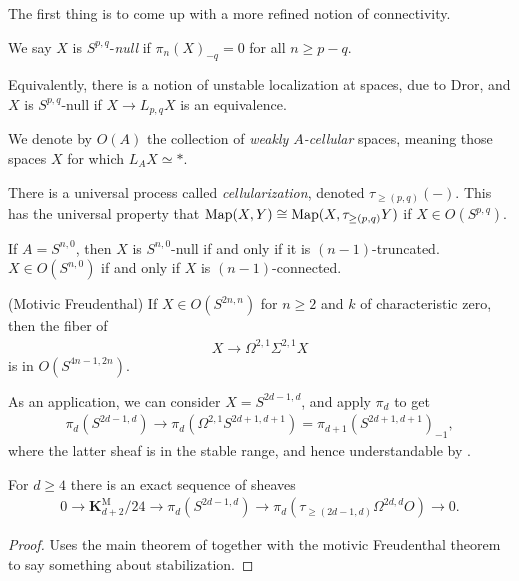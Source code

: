 \documentclass[11pt,openany]{book}
\providecommand{\KM}{\mathbf{K}^\mathrm{M}}
\begin{document}
The first thing is to come up with a more refined notion of connectivity.

\begin{definition} We say $X$ is $S^{p,q}$-\textit{null} if $\pi_n(X)_{-q} = 0$ for all $n \ge p-q$.
\end{definition}

Equivalently, there is a notion of unstable localization at spaces, due to Dror, and $X$ is $S^{p,q}$-null if $X \to L_{p,q}X$ is an equivalence.

\begin{definition} We denote by $O(A)$ the collection of \textit{weakly $A$-cellular} spaces, meaning those spaces $X$ for which $L_A X\simeq \ast$.
\end{definition}

There is a universal process called \textit{cellularization}, denoted $\tau_{\ge(p,q)}(-)$. This has the universal property that $\mathrm{Map}(X,Y) \cong \mathrm{Map}(X,\tau_{\ge(p,q)}Y)$ if $X \in O(S^{p,q})$.


\begin{example} If $A = S^{n,0}$, then $X$ is $S^{n,0}$-null if and only if it is $(n-1)$-truncated. $X \in O(S^{n,0})$ if and only if $X$ is $(n-1)$-connected.
\end{example}

\begin{theorem} (Motivic Freudenthal) If $X \in O(S^{2n,n})$ for $n\ge2$ and $k$ of characteristic zero, then the fiber of
\begin{align*}
    X \to \Omega^{2,1}\Sigma^{2,1}X
\end{align*}
is in $O(S^{4n-1,2n})$.
\end{theorem}

As an application, we can consider $X = S^{2d-1,d}$, and apply $\pi_d$ to get
\begin{align*}
    \pi_d(S^{2d-1,d}) \to \pi_d(\Omega^{2,1}S^{2d+1,d+1}) = \pi_{d+1}(S^{2d+1,d+1})_{-1},
\end{align*}
where the latter sheaf is in the stable range, and hence understandable by \cite{RSO}.

\begin{theorem} \cite[7.2.1]{Freudenthal} For $d\ge4$ there is an exact sequence of sheaves
\begin{align*}
    0 \to \KM_{d+2}/24 \to \pi_d(S^{2d-1,d}) \to \pi_d(\tau_{\ge(2d-1,d)}\Omega^{2d,d}O) \to 0.
\end{align*}
\end{theorem}
\begin{proof} Uses the main theorem of \cite{RSO} together with the motivic Freudenthal theorem to say something about stabilization.
\end{proof}
\end{document}
